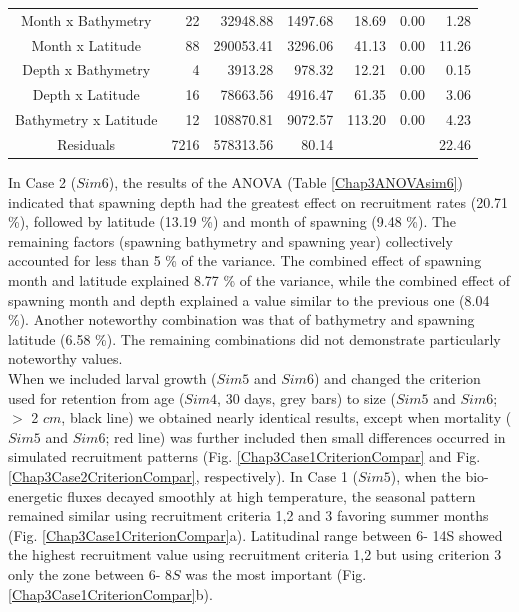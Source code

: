 \begin{table}[H]
\begin{adjustbox}{width=0.9\textwidth}
\begin{tabular}{c|r|r|r|r|r|r}
Month x Bathymetry    & 22   & 32948.88  & 1497.68   & 18.69   & 0.00                & 1.28  \\
Month x Latitude      & 88   & 290053.41 & 3296.06   & 41.13   & 0.00                & 11.26 \\
Depth x Bathymetry    & 4    & 3913.28   & 978.32    & 12.21   & 0.00                & 0.15  \\
Depth x Latitude      & 16   & 78663.56  & 4916.47   & 61.35   & 0.00                & 3.06  \\
Bathymetry x Latitude & 12   & 108870.81 & 9072.57   & 113.20  & 0.00                & 4.23  \\
Residuals             & 7216 & 578313.56 & 80.14     &         &                     & 22.46 \\
\bottomrule
\end{tabular}
\end{adjustbox}
\label{Chap3ANOVAsim5}
\end{table}

In Case 2 ($Sim 6$), the results of the ANOVA (Table \ref{Chap3ANOVAsim6}) indicated that spawning depth had the greatest effect on recruitment rates (20.71 \%), followed by latitude (13.19 \%) and month of spawning (9.48 \%). The remaining factors (spawning bathymetry and spawning year) collectively accounted for less than 5 \% of the variance. The combined effect of spawning month and latitude explained 8.77 \% of the variance, while the combined effect of spawning month and depth explained a value similar to the previous one (8.04 \%). Another noteworthy combination was that of bathymetry and spawning latitude (6.58 \%). The remaining combinations did not demonstrate particularly noteworthy values.\\

When we included larval growth ($Sim 5$ and $Sim 6$) and changed the criterion used for retention from age ($Sim 4$, 30 days, grey bars) to size ($Sim 5$ and $Sim 6$; $>$ 2 $cm$, black line) we obtained nearly identical results, except when mortality ($Sim 5$ and $Sim 6$; red line) was further included then small differences occurred in simulated recruitment patterns (Fig. \ref{Chap3Case1CriterionCompar} and Fig. \ref{Chap3Case2CriterionCompar}, respectively). In Case 1 ($Sim 5$), when the bio-energetic fluxes decayed smoothly at high temperature, the seasonal pattern remained similar using recruitment criteria 1,2 and 3 favoring summer months (Fig. \ref{Chap3Case1CriterionCompar}a). Latitudinal range between 6\textdegree - 14\textdegree S showed the highest recruitment value using recruitment criteria 1,2 but using criterion 3 only the zone between 6\textdegree - 8\textdegree $S$ was the most important (Fig. \ref{Chap3Case1CriterionCompar}b).\\

